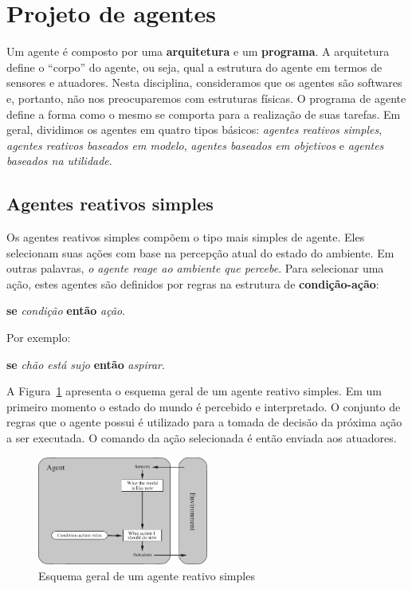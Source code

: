 \section{Projeto de agentes}

Um agente é composto por uma \textbf{arquitetura} e um \textbf{programa}. A arquitetura define o ``corpo'' do agente, ou seja, qual a estrutura do agente em termos de sensores e atuadores. Nesta disciplina, consideramos que os agentes são softwares e, portanto, não nos preocuparemos com estruturas físicas. O programa de agente define a forma como o mesmo se comporta para a realização de suas tarefas. Em geral, dividimos os agentes em quatro tipos básicos: \textit{agentes reativos simples}, \textit{agentes reativos baseados em modelo}, \textit{agentes baseados em objetivos} e \textit{agentes baseados na utilidade}.

\subsection{Agentes reativos simples}

Os agentes reativos simples compõem o tipo mais simples de agente. Eles selecionam suas ações com base na percepção atual do estado do ambiente. Em outras palavras, \textit{o agente reage ao ambiente que percebe}. Para selecionar uma ação, estes agentes são definidos por regras na estrutura de \textbf{condição-ação}:

\begin{center}
	\textbf{se} \textit{condição} \textbf{então} \textit{ação}.
\end{center}

Por exemplo:

\begin{center}
	\textbf{se} \textit{chão está sujo} \textbf{então} \textit{aspirar}.
\end{center}

\insertspace

A Figura~\ref{fig:agente-reativo-simples} apresenta o esquema geral de um agente reativo simples. Em um primeiro momento o estado do mundo é percebido e interpretado. O conjunto de regras que o agente possui é utilizado para a tomada de decisão da próxima ação a ser executada. O comando da ação selecionada é então enviada aos atuadores.

\insertspace

\begin{figure}[h]
	\centering
	\includegraphics[width=0.5\textwidth]{img/agente-reativo-simples}
	\caption{Esquema geral de um agente reativo simples}
	\label{fig:agente-reativo-simples}
\end{figure}

